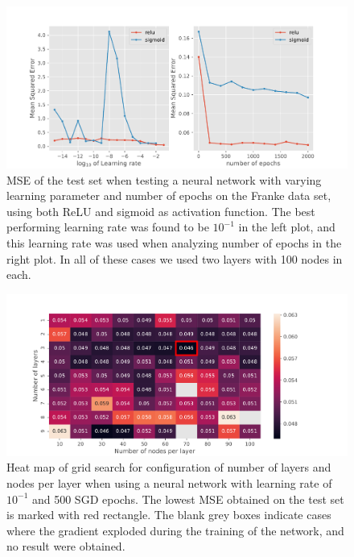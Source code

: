 \begin{figure}[!h]
    \centering
    \includegraphics[scale=0.6]{Figures/Regression/eta-mse_l100-100_epochs500.pdf}
    \caption{MSE of the test set when testing a neural network with varying learning parameter and number of epochs on the Franke data set, using both ReLU and sigmoid as activation function. The best performing learning rate was found to be $10^{-1}$ in the left plot, and this learning rate was used when analyzing number of epochs in the right plot. In all of these cases we used two layers with 100 nodes in each.}
    \label{fig:eta_epoch_analysis_nn_regression}
\end{figure}
\begin{figure}
    \centering
    \includegraphics[scale=0.6]{Figures/Regression/heatmap_epochs500_layers10.pdf}
    \caption{Heat map of grid search for configuration of number of layers and nodes per layer when using a neural network with learning rate of $10^{-1}$ and 500 SGD epochs. The lowest MSE obtained on the test set is marked with red rectangle. The blank grey boxes indicate cases where the gradient exploded during the training of the network, and no result were obtained.}
    \label{fig:heatmap_nn_regression}
\end{figure}
